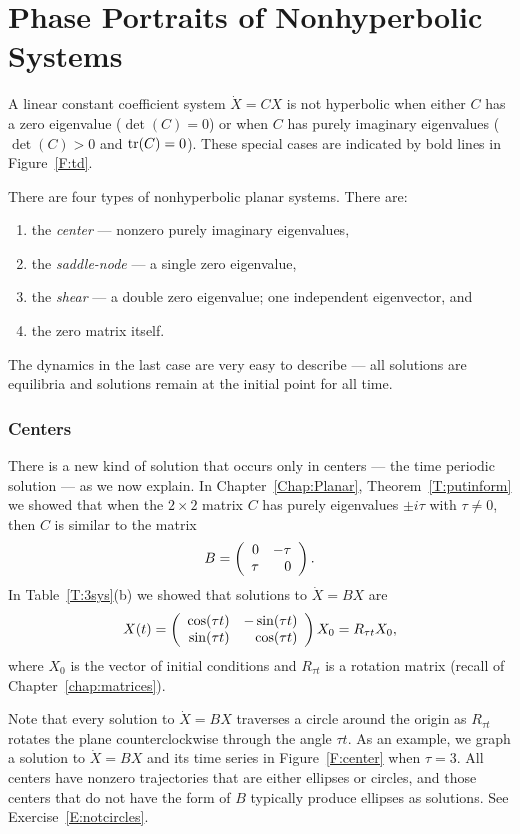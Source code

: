 \documentclass{ximera}
\begin{document}
\section{Phase Portraits of Nonhyperbolic Systems} \label{S:6.9}

A linear constant coefficient system $\dot{X}=CX$ is not hyperbolic
when either $C$ has a zero eigenvalue ($\det(C)=0$) or when $C$ has
purely imaginary eigenvalues ($\det(C)>0$ and ${\rm tr}(C)=0$).  These
special cases are indicated by bold lines in Figure~\ref{F:td}.

There are four types of nonhyperbolic planar systems.  There are:
\begin{enumerate}
\item	the {\em center} --- nonzero purely imaginary
eigenvalues,
\item	the {\em saddle-node\/} --- a single
zero eigenvalue,
\item	the {\em shear\/} --- a double zero eigenvalue;
one  independent eigenvector, and
\item	the zero matrix itself.
\end{enumerate}
The dynamics in the last case are very easy to describe --- all solutions
are equilibria and solutions remain at the initial point for all time.

\subsubsection*{Centers}

There is a new kind of solution that occurs only in centers --- the time
periodic solution --- as we now explain.
In Chapter~\ref{Chap:Planar},
Theorem~\ref{T:putinform} we showed that when the $2\times 2$
matrix $C$ has purely eigenvalues $\pm i\tau$ with $\tau\neq 0$, then $C$
is similar to the matrix
\[
B =   \left(\begin{array}{rr} 0 & -\tau\\ \tau &0\end{array}\right).
\]
In Table~\ref{T:3sys}(b) we showed that solutions to $\dot{X}=BX$ are
\[
X(t) = \left(\begin{array}{rr} \cos(\tau t) & -\sin(\tau t)\\ \sin(\tau t) &\cos(\tau t)\end{array}\right)X_0
=R_{\tau t}X_0,
\]
where $X_0$ is the vector of initial conditions and $R_{\tau t}$ is a
rotation matrix (recall  of Chapter~\ref{chap:matrices}).

Note that every solution to $\dot{X}=BX$ traverses a circle around the
origin as $R_{\tau t}$ rotates the plane counterclockwise through the angle
$\tau t$.  As an example, we graph
a solution to $\dot{X}=BX$ and its time
series in Figure~\ref{F:center} when $\tau=3$.  All centers have nonzero
trajectories that are either ellipses or circles, and
those centers that do
not have the form of $B$ typically produce ellipses as solutions.  See
Exercise~\ref{E:notcircles}.
\end{document}
